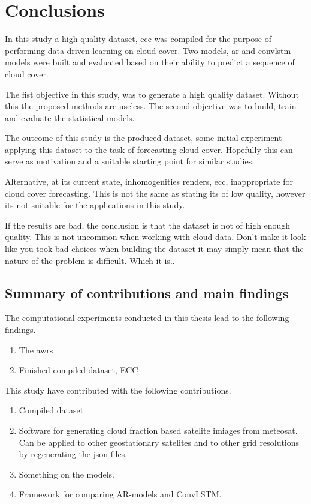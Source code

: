 \chapter{Conclusions}
In this study a high quality dataset, \acrfull{ecc} was compiled for the purpose of performing data-driven learning on cloud cover. Two models, \acrfull{ar} and \acrlong{convlstm} models were built and evaluated based on their ability to predict a sequence of cloud cover.

The fist objective in this study, was to generate a high quality dataset. Without this the proposed methods are useless. The second objective was to build, train and evaluate the statistical models. 

The outcome of this study is the produced dataset, some initial experiment applying this dataset to the task of forecasting cloud cover. Hopefully this can serve as motivation and a suitable starting point for similar studies. 

Alternative, at its current state, inhomogenities renders, \acrshort{ecc}, inappropriate for cloud cover forecasting. This is not the same as stating its of low quality, however its not suitable for the applications in this study. 

If the results are bad, the conclusion is that the dataset is not of high enough quality. This is not uncommon when working with cloud data. Don't make it look like you took bad choices when building the dataset it may simply mean that the nature of the problem is difficult. Which it is..



\section{Summary of contributions and main findings }
The computational experiments conducted in this thesis lead to the following findings. 
\begin{enumerate}
    \item The \acrfull{awrs}
    \item Finished compiled dataset, ECC
\end{enumerate}

This study have contributed with the following contributions.
\begin{enumerate}
    \item Compiled dataset 
    \item Software for generating cloud fraction based satelite imiages from meteosat. Can be applied to other geostationary satelites and to other grid resolutions by regenerating the json files.
    \item Something on the models. 
    \item Framework for comparing AR-models and ConvLSTM.
\end{enumerate}

